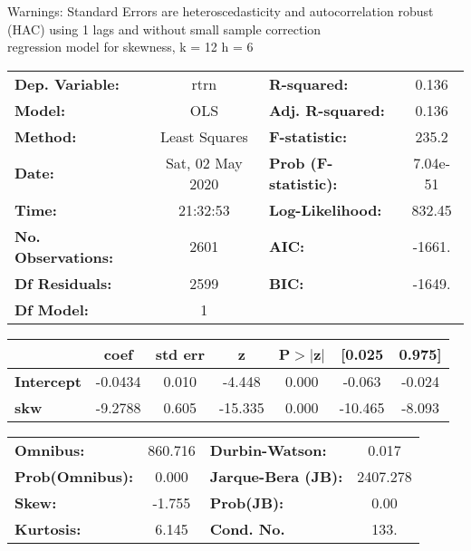 Warnings: \newline
 [1] Standard Errors are heteroscedasticity and autocorrelation robust (HAC) using 1 lags and without small sample correction\\ 

regression model for skewness, k = 12 h = 6\begin{center}
\begin{tabular}{lclc}
\toprule
\textbf{Dep. Variable:}    &       rtrn       & \textbf{  R-squared:         } &     0.136   \\
\textbf{Model:}            &       OLS        & \textbf{  Adj. R-squared:    } &     0.136   \\
\textbf{Method:}           &  Least Squares   & \textbf{  F-statistic:       } &     235.2   \\
\textbf{Date:}             & Sat, 02 May 2020 & \textbf{  Prob (F-statistic):} &  7.04e-51   \\
\textbf{Time:}             &     21:32:53     & \textbf{  Log-Likelihood:    } &    832.45   \\
\textbf{No. Observations:} &        2601      & \textbf{  AIC:               } &    -1661.   \\
\textbf{Df Residuals:}     &        2599      & \textbf{  BIC:               } &    -1649.   \\
\textbf{Df Model:}         &           1      & \textbf{                     } &             \\
\bottomrule
\end{tabular}
\begin{tabular}{lcccccc}
                   & \textbf{coef} & \textbf{std err} & \textbf{z} & \textbf{P$> |$z$|$} & \textbf{[0.025} & \textbf{0.975]}  \\
\midrule
\textbf{Intercept} &      -0.0434  &        0.010     &    -4.448  &         0.000        &       -0.063    &       -0.024     \\
\textbf{skw}       &      -9.2788  &        0.605     &   -15.335  &         0.000        &      -10.465    &       -8.093     \\
\bottomrule
\end{tabular}
\begin{tabular}{lclc}
\textbf{Omnibus:}       & 860.716 & \textbf{  Durbin-Watson:     } &    0.017  \\
\textbf{Prob(Omnibus):} &   0.000 & \textbf{  Jarque-Bera (JB):  } & 2407.278  \\
\textbf{Skew:}          &  -1.755 & \textbf{  Prob(JB):          } &     0.00  \\
\textbf{Kurtosis:}      &   6.145 & \textbf{  Cond. No.          } &     133.  \\
\bottomrule
\end{tabular}
\end{center}

